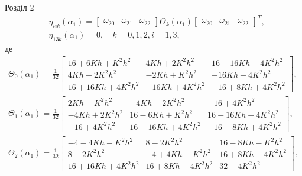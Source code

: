 \documentclass[8pt]{beamer}
\numberwithin{figure}{section}
\numberwithin{equation}{section}
\numberwithin{table}{section}
\begin{document}
\begin{frame}{Розділ 2}
\begin{equation}
\begin{aligned}
&\eta_{iik}\left(\alpha_1\right)=\left[\begin{array}{ccc}
\omega_{20} & \omega_{21} & \omega_{22}
\end{array} \right] \Theta_k\left(\alpha_1\right) \left[\begin{array}{ccc}
\omega_{20} & \omega_{21} & \omega_{22}
\end{array} \right]^T,\\
&\eta_{13k}\left(\alpha_1\right)=0, \quad k=0,1,2, i=1,3,
\end{aligned}
\end{equation}
де
\begin{equation}\label{eq:sqt_strain_nl}
\begin{aligned}
\Theta_0\left(\alpha_1\right)=\frac{1}{32}
\left[
\begin{array}{ccc}
16+6Kh+K^2h^2 & 4Kh+2K^2h^2 & 16+16Kh+4K^2h^2 \\ 
4Kh+2K^2h^2 & -2Kh+K^2h^2 & -16Kh+4K^2h^2 \\ 
16+16Kh+4K^2h^2 & -16Kh+4K^2h^2 & -16+8Kh+4K^2h^2
\end{array}
\right],\\
\Theta_1\left(\alpha_1\right)=\frac{1}{32}
\left[
\begin{array}{ccc}
2Kh+K^2h^2 & -4Kh+2K^2h^2 & -16+4K^2h^2 \\ 
-4Kh+2K^2h^2 & 16-6Kh+K^2h^2 & 16-16Kh+4K^2h^2 \\ 
-16+4K^2h^2  & 16-16Kh+4K^2h^2 & -16-8Kh+4K^2h^2
\end{array}
\right],\\
\Theta_2\left(\alpha_1\right)=\frac{1}{32}
\left[
\begin{array}{ccc}
-4-4Kh-K^2h^2 & 8-2K^2h^2 & 16-8Kh-K^2h^2 \\ 
8-2K^2h^2 & -4+4Kh-K^2h^2 & 16+8Kh-4K^2h^2 \\ 
16+16Kh+4K^2h^2 & 16+8Kh-4K^2h^2 & 32-4K^2h^2
\end{array}
\right],\\
\end{aligned}
\end{equation}

\end{frame}
\end{document}
